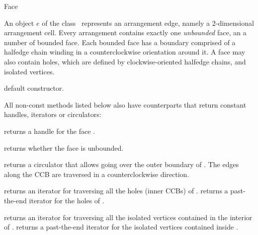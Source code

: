 
\ccRefPageBegin

\begin{ccRefClass}{Face}

\ccDefinition
An object $e$ of the class \ccRefName\ represents an arrangement edge,
namely a $2$-dimensional arrangement cell. Every arrangement contains
exactly one \emph{unbounded} face, an a number of bounded face. Each
bounded face has a boundary comprised of a halfedge chain winding in
a counterclockwise orientation around it. A face may also contain holes,
which are defined by clockwise-oriented halfedge chains, and isolated
vertices.

\ccInheritsFrom

\ccCreation
{}

   {default constructor.}    	    
    
\ccAccessFunctions

All non-const methods listed below also have  counterparts
that return constant handles, iterators or circulators:

    {returns a handle for the face \ccVar{}.}

    {returns whether the face is unbounded.}    

    {returns a circulator that allows going over the outer boundary of
     \ccVar{}. The edges along the CCB are traversed in a counterclockwise
     direction.
     }
    
    {returns an iterator for traversing all the holes (inner CCBs) of
     \ccVar{}.}
\ccGlue
{}
    {returns a past-the-end iterator for the holes of \ccVar{}.}

    {returns an iterator for traversing all the isolated vertices
     contained in the interior of \ccVar{}.}
\ccGlue
{}
    {returns a past-the-end iterator for the isolated vertices 
     contained inside \ccVar{}.}

\end{ccRefClass}

\ccRefPageEnd